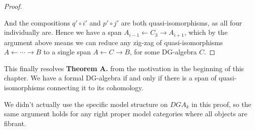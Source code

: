 \begin{proof}
\begin{center}
\end{center}

And the compositions $q'\circ i'$ and $p'\circ j'$ are both quasi-isomorphisms, as all four individually are. Hence we have a span $A_{i-1}\longleftarrow C_3 \longrightarrow A_{i+1}$, which by the argument above means we can reduce any zig-zag of quasi-isomorphisms $A\longleftarrow \cdots \longrightarrow B$ to a single span $A\longleftarrow C\longrightarrow B$, for some DG-algebra $C$. 
\end{proof}

This finally resolves \textbf{Theorem A.} from the motivation in the beginning of this chapter. We have a formal DG-algebra if and only if there is a span of quasi-isomorphisms connecting it to its cohomology.  


We didn't actually use the specific model structure on $DGA_k$ in this proof, so the same argument holds for any right proper model categories where all objects are fibrant. 

